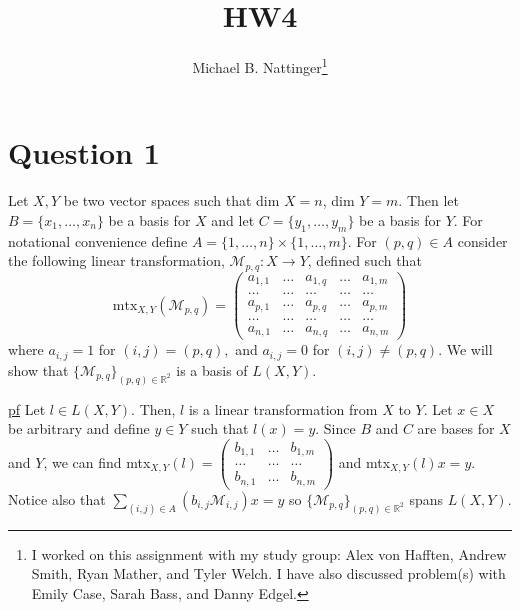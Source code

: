 \documentclass[11pt]{article} %
\title{HW4}
\author{Michael B. Nattinger\footnote{I worked on this assignment with my study group: Alex von Hafften, Andrew Smith, Ryan Mather, and Tyler Welch. I have also discussed problem(s) with Emily Case, Sarah Bass, and Danny Edgel.}}
\begin{document}
\maketitle

\section{Question 1}
Let $X,Y$ be two vector spaces such that dim $X = n$, dim $Y = m$. Then let $B = \{ x_1, \dots, x_n\} $ be a basis for $X$ and let $C = \{ y_1, \dots, y_m\}$ be a basis for $Y$. For notational convenience define $A = \{ 1 , \dots, n\} \times \{1, \dots,m \}$. For $(p,q) \in A$ consider the following linear transformation, $\mathcal{M}_{p,q}: X \rightarrow Y$, defined such that 
\begin{equation*}
\text{mtx}_{X,Y}(\mathcal{M}_{p,q}) = \begin{pmatrix}a_{1,1} & \dots  & a_{1,q} & \dots & a_{1,m} \\ \dots & \dots & \dots & \dots & \dots \\ a_{p,1} & \dots  & a_{p,q} & \dots & a_{p,m} \\ \dots & \dots & \dots & \dots & \dots \\ a_{n,1} & \dots  & a_{n,q} & \dots & a_{n,m} \end{pmatrix}
\end{equation*}
 where $a_{i,j} = 1$ for $(i,j) = (p,q),$ and $a_{i,j} = 0$ for $(i,j) \neq (p,q)$. We will show that $\{ \mathcal{M}_{p,q} \}_{(p,q) \in \mathbb{R}^2}$ is a basis of $L(X,Y).$

\underline{pf} Let $l \in L(X,Y)$. Then, $l$ is a linear transformation from $X$ to $Y$. Let $x \in X$ be arbitrary and define $y \in Y$ such that $l(x) = y$. Since $B$ and $C$ are bases for $X$ and $Y$, we can find mtx$_{X,Y}(l) = \begin{pmatrix}b_{1,1} & \dots  & b_{1,m} \\ \dots & \dots & \dots \\ b_{n,1} & \dots  & b_{n,m} \end{pmatrix}$ and mtx$_{X,Y}(l) x = y$. Notice also that $\sum_{(i,j) \in A} \left( b_{i,j} \mathcal{M}_{i,j} \right) x = y $ so $\{ \mathcal{M}_{p,q} \}_{(p,q) \in \mathbb{R}^2}$ spans $L(X,Y)$.
\end{document}
